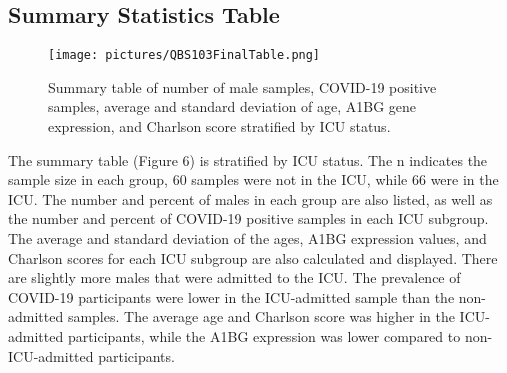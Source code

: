 \documentclass{article}
\begin{document}
\subsection{Summary Statistics Table}
\begin{figure}[H]
    \centering
    \texttt{[image: pictures/QBS103FinalTable.png]}
    \caption{Summary table of number of male samples, COVID-19 positive samples, average and standard deviation of age, A1BG gene expression, and Charlson score stratified by ICU status.}
    \label{fig:placeholder}
\end{figure}

The summary table (Figure 6) is stratified by ICU status. The n indicates the sample size in each group, 60 samples were not in the ICU, while 66 were in the ICU. The number and percent of males in each group are also listed, as well as the number and percent of COVID-19 positive samples in each ICU subgroup. The average and standard deviation of the ages, A1BG expression values, and Charlson scores for each ICU subgroup are also calculated and displayed. There are slightly more males that were admitted to the ICU. The prevalence of COVID-19 participants were lower in the ICU-admitted sample than the non-admitted samples. The average age and Charlson score was higher in the ICU-admitted participants, while the A1BG expression was lower compared to non-ICU-admitted participants. 

\newpage




\end{document}
